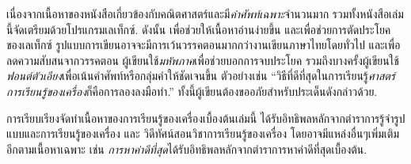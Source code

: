 
\pagebreak

\begin{minipage}{6in}
{\small
\begin{shaded}
เนื่องจากเนื้อหาของหนังสือเกี่ยวข้องกับคณิตศาสตร์และมี\textit{คำศัพท์เฉพาะ}จำนวนมาก 
รวมทั้งหนังสือเล่มนี้จัดเตรียมด้วยโปรแกรมเลเท็กซ์. 
ดังนั้น เพื่อช่วยให้เนื้อหาอ่านง่ายขึ้น และเพื่อช่วยการตัดประโยคของเลเท็กซ์ รูปแบบการเขียนอาจจะมีการเว้นวรรคตอนมากกว่างานเขียนภาษาไทยโดยทั่วไป 
และเพื่อลดความสับสนจากวรรคตอน ผู้เขียนใช้\textit{มหัพภาค}เพื่อช่วยบอกการจบประโยค
รวมถึงบางครั้งผู้เขียนใช้\textit{ฟอนต์ตัวเอียง}เพื่อเน้นคำศัพท์หรือกลุ่มคำให้ชัดเจนขึ้น
ตัวอย่างเช่น ``วิธีที่ดีที่สุดในการเรียนรู้\textit{ศาสตร์การเรียนรู้ของเครื่อง}ก็คือการลองลงมือทำ.''
ทั้งนี้ผู้เขียนต้องขออภัยสำหรับประเด็นดังกล่าวด้วย.

การเรียบเรียงจัดทำเนื้อหาของการเรียนรู้ของเครื่องเบื้องต้นเล่มนี้  ได้รับอิทธิพลหลักจากตำราการรู้จำรูปแบบและการเรียนรู้ของเครื่อง\cite{Bishop2006a} และ วิดีทัศน์สอนวิชาการเรียนรู้ของเครื่อง\cite{Ng2013a}
โดยอาจมีแหล่งอื่นๆเพิ่มเติมอีกตามเนื้อหาเฉพาะ เช่น \textit{การหาค่าดีที่สุด}ได้รับอิทธิพลหลักจากตำราการหาค่าดีที่สุดเบื้องต้น\cite{ChongZak2ndEd}.
\end{shaded}
}
\end{minipage}










